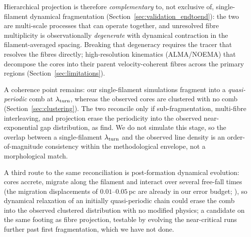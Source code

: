 \documentclass[usenatbib,twoside,twocolumn]{mnras}
\begin{document}
Hierarchical projection is therefore \emph{complementary} to, not exclusive of, single-filament dynamical fragmentation (Section~\ref{sec:validation_endtoend}): the two are multi-scale processes that can operate together, and unresolved fibre multiplicity is observationally \emph{degenerate} with dynamical contraction in the filament-averaged spacing. Breaking that degeneracy requires the tracer that resolves the fibres directly; high-resolution kinematics (ALMA/NOEMA) that decompose the cores into their parent velocity-coherent fibres across the primary regions (Section~\ref{sec:limitations}).

A coherence point remains: our single-filament simulations fragment into a \emph{quasi-periodic} comb at $\lambda_{\rm turn}$, whereas the observed cores are clustered with no comb (Section~\ref{sec:clustering}). The two reconcile only if sub-fragmentation, multi-fibre interleaving, and projection erase the periodicity into the observed near-exponential gap distribution, as \citet{Clarke2020} find. We do not simulate this stage, so the overlap between a single-filament $\lambda_{\rm turn}$ and the observed line density is an order-of-magnitude consistency within the methodological envelope, not a morphological match.

A third route to the same reconciliation is post-formation dynamical evolution: cores accrete, migrate along the filament and interact over several free-fall times (the migration displacements of $0.01$--$0.05$\,pc are already in our error budget; \citealt{Kirk2016,Mattern2018}), so dynamical relaxation of an initially quasi-periodic chain could erase the comb into the observed clustered distribution with no modified physics; a candidate on the same footing as fibre projection, testable by evolving the near-critical runs further past first fragmentation, which we have not done.
\end{document}
